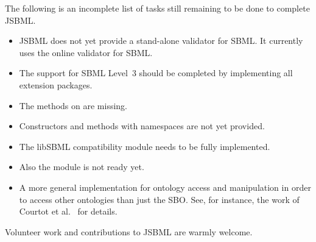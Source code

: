 
The following is an incomplete list of tasks still remaining to be done to
complete JSBML.

\begin{itemize}

\item JSBML does not yet provide a stand-alone validator for SBML. It
  currently uses the online validator for SBML.

\item The support for SBML Level~3 should be completed
  by implementing all extension packages.

\item The 
  methods on  are missing.

\item Constructors and methods with namespaces are not yet provided.

\item The libSBML compatibility module
  needs to be fully implemented.

\item Also the  module is not ready yet.

\item A more general implementation for ontology access and manipulation in
  order to access other ontologies than just the SBO. See, for instance,
  the work of Courtot et al.~\cite{Courtot2011a} for details.

\end{itemize}

Volunteer work and contributions to JSBML are warmly welcome.
